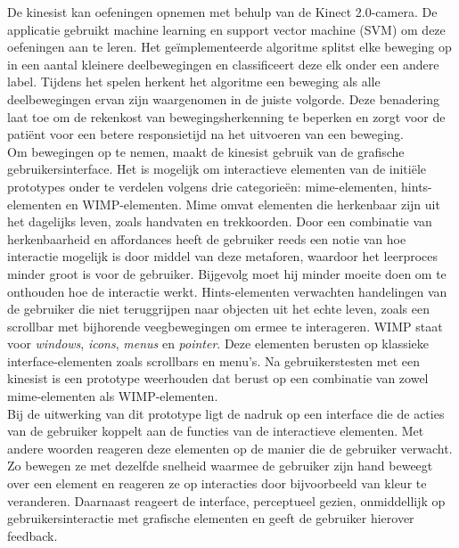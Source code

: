 De kinesist kan oefeningen opnemen met behulp van de Kinect 2.0-camera. De applicatie gebruikt machine learning en support vector machine (SVM) om deze oefeningen aan te leren. Het ge\"implementeerde algoritme splitst elke beweging op in een aantal kleinere deelbewegingen en classificeert deze elk onder een andere label. Tijdens het spelen herkent het algoritme een beweging als alle deelbewegingen ervan zijn waargenomen in de juiste volgorde. Deze benadering laat toe om de rekenkost van bewegingsherkenning te beperken en zorgt voor de pati\"ent voor een betere responsietijd na het uitvoeren van een beweging.\\

Om bewegingen op te nemen, maakt de kinesist gebruik van de grafische gebruikersinterface. Het is mogelijk om interactieve elementen van de initi\"ele prototypes onder te verdelen volgens drie categorie\"en: mime-elementen, hints-elementen en WIMP-elementen. Mime omvat elementen die herkenbaar zijn uit het dagelijks leven, zoals handvaten en trekkoorden. Door een combinatie van herkenbaarheid en affordances heeft de gebruiker reeds een notie van hoe interactie mogelijk is door middel van deze metaforen, waardoor het leerproces minder groot is voor de gebruiker. Bijgevolg moet hij minder moeite doen om te onthouden hoe de interactie werkt. Hints-elementen verwachten handelingen van de gebruiker die niet teruggrijpen naar objecten uit het echte leven, zoals een scrollbar met bijhorende veegbewegingen om ermee te interageren. WIMP staat voor \emph{windows}, \emph{icons}, \emph{menus} en \emph{pointer}. Deze elementen berusten op klassieke interface-elementen zoals scrollbars en menu's. Na gebruikerstesten met een kinesist is een prototype weerhouden dat berust op een combinatie van zowel mime-elementen als WIMP-elementen.\\

Bij de uitwerking van dit prototype ligt de nadruk op een interface die de acties van de gebruiker koppelt aan de functies van de interactieve elementen. Met andere woorden reageren deze elementen op de manier die de gebruiker verwacht. Zo bewegen ze met dezelfde snelheid waarmee de gebruiker zijn hand beweegt over een element en reageren ze op interacties door bijvoorbeeld van kleur te veranderen. Daarnaast reageert de interface, perceptueel gezien, onmiddellijk op gebruikersinteractie met grafische elementen en geeft de gebruiker hierover feedback.\\

